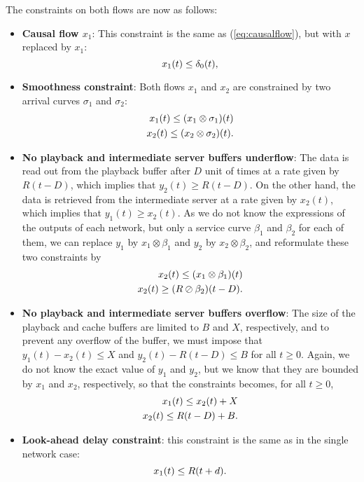 The constraints on both flows are now as follows:

\begin{itemize}
\item {\bf Causal flow $x_1$}: This constraint is the same as (\ref{eq:causalflow}), but with $x$ replaced by $x_1$:
\begin{equation}
\mylabel{eq:causalflow1}
x_1(t) \leq \delta_0 (t),
\end{equation}

\item{\bf Smoothness constraint}: Both flows $x_1$ and $x_2$ are constrained by two arrival curves
$\sigma_1$ and $\sigma_2$:  %
\begin{eqnarray}
\mylabel{eq:smoothnessminplus1}
x_1(t) \leq (x_1 \otimes \sigma_1)(t) \\
\mylabel{eq:smoothnessminplus2}
x_2(t) \leq (x_2 \otimes \sigma_2)(t).
\end{eqnarray}

\item {\bf No playback and intermediate server buffers underflow}:
The data is read out from the playback buffer after $D$ unit of times
at a rate given by $R(t - D) $, which implies that $y_2(t) \geq R(t-D)$.
On the other hand, the data is retrieved from the intermediate server
at a rate given by $x_2(t)$, which implies that $y_1(t) \geq x_2(t)$.
As we do not know the expressions of the outputs of each network, but only a service curve
$\beta_1$ and $\beta_2$ for each of them, we can replace $y_1$ by $x_1 \otimes \beta_1$ and
$y_2$ by $x_2 \otimes \beta_2$, and reformulate these two constraints by
\begin{eqnarray}
\mylabel{eq:playbackdelay1}
x_2(t) \leq (x_1 \otimes \beta_1)(t) \\
\mylabel{eq:playbackdelay2}
x_2(t) \geq (R \oslash \beta_2)(t - D).
\end{eqnarray}


\item{\bf No playback and intermediate server  buffers overflow}:
The size of the playback and cache buffers are limited to $B$ and $X$, respectively,
and to prevent any overflow of the buffer, we must impose that $y_1(t) - x_2(t) \leq X$ and
$y_2(t) -  R(t-D) \leq B$ for all $t \geq 0$. Again, we do not know the
exact value of  $y_1$ and $y_2$, but we know that they are bounded by $x_1$ and $x_2$, respectively,
so that the constraints becomes, for all $t \geq 0$,
\begin{eqnarray}
\mylabel{eq:playbackbuffer1}
x_1(t) \leq x_2(t) + X \\
\mylabel{eq:playbackbuffer2}
x_2(t) \leq R(t - D) + B.
\end{eqnarray}


\item {\bf Look-ahead delay constraint}: this constraint is the same as in the single network case:
\begin{equation}
\mylabel{eq:prefetchingdelay1}
x_1(t) \leq  R(t+d).
\end{equation}
\end{itemize}


